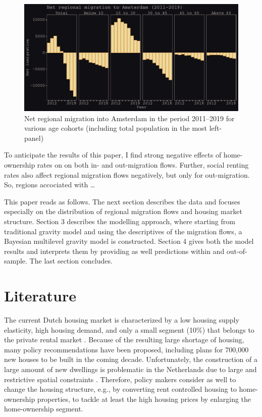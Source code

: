\documentclass[fleqn,10pt]{SelfArx} %
\begin{document}
\begin{figure}[h!]\centering %
 \includegraphics[width=1\linewidth]{../../fig/outmig_amsterdam.pdf}
 \caption{Net regional migration into Amsterdam in the period 2011--2019 for
   various age cohorts (including total population in the most left-panel)}
  \label{fig:adam_mig}
\end{figure}

To anticipate the results of this paper, I find strong negative effects of
home-ownership rates on on both in- and out-migration flows. Further, social
renting rates also affect regional migration flows negatively, but only for
out-migration. So, regions accociated with \ldots

This paper reads as follows. The next section describes the data and focuses
especially on the distribution of regional migration flows and housing market
structure. Section 3 describes the modelling approach, where starting from
traditional gravity model and using the descriptives of the migration flows, a
Bayesian multilevel gravity model is constructed. Section 4 gives both the model
results and interprets them by providing as well predictions within and
out-of-sample. The last section concludes.

\section{Literature}

The current Dutch housing market is characterized by a low housing supply
elasticity, high housing demand, and only a small segment (10\%) that belongs to
the private rental market \citep{michielsen2017}. Because of the resulting large
shortage of housing, many policy recommendations have been proposed, including
plans for 700,000 new houses to be built in the coming decade. Unfortunately,
the construction of a large amount of new dwellings is problematic in the
Netherlands due to large and restrictive spatial constraints
\citep{michielsen2019}. Therefore, policy makers consider as well to change the
housing structure, e.g., by converting rent controlled housing to home-ownership
properties, to tackle at least the high housing prices by enlarging the
home-ownership segment.
\end{document}
